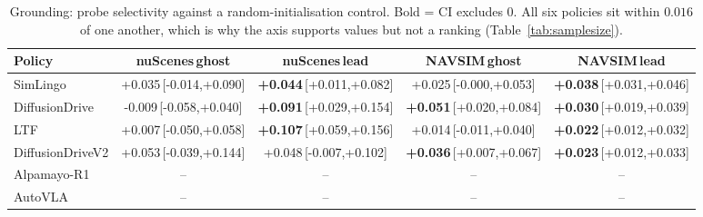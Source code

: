 \begin{table}[!tb]
\centering
\footnotesize
\setlength{\tabcolsep}{4pt}
\caption{Grounding: probe selectivity against a random-initialisation control. Bold = CI excludes $0$. All six policies sit within $0.016$ of one another, which is why the axis supports values but not a ranking (Table~\ref{tab:samplesize}).}
\label{tab:gvs}
\begin{tabular}{lcccc}
\toprule
Policy & nuScenes\,ghost & nuScenes\,lead & NAVSIM\,ghost & NAVSIM\,lead\\
\midrule
SimLingo & +0.035\,{\scriptsize[-0.014,+0.090]} & \textbf{+0.044}\,{\scriptsize[+0.011,+0.082]} & +0.025\,{\scriptsize[-0.000,+0.053]} & \textbf{+0.038}\,{\scriptsize[+0.031,+0.046]}\\
DiffusionDrive & -0.009\,{\scriptsize[-0.058,+0.040]} & \textbf{+0.091}\,{\scriptsize[+0.029,+0.154]} & \textbf{+0.051}\,{\scriptsize[+0.020,+0.084]} & \textbf{+0.030}\,{\scriptsize[+0.019,+0.039]}\\
LTF & +0.007\,{\scriptsize[-0.050,+0.058]} & \textbf{+0.107}\,{\scriptsize[+0.059,+0.156]} & +0.014\,{\scriptsize[-0.011,+0.040]} & \textbf{+0.022}\,{\scriptsize[+0.012,+0.032]}\\
DiffusionDriveV2 & +0.053\,{\scriptsize[-0.039,+0.144]} & +0.048\,{\scriptsize[-0.007,+0.102]} & \textbf{+0.036}\,{\scriptsize[+0.007,+0.067]} & \textbf{+0.023}\,{\scriptsize[+0.012,+0.033]}\\
Alpamayo-R1 & -- & -- & -- & --\\
AutoVLA & -- & -- & -- & --\\
\bottomrule
\end{tabular}
\end{table}

